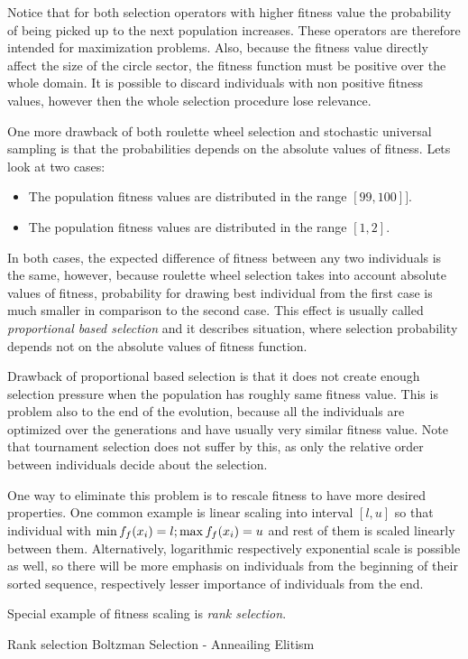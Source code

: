 Notice that for both selection operators with higher fitness value the probability of being picked up to the next population increases. These operators are therefore intended for maximization problems. Also, because the fitness value directly affect the size of the circle sector, the fitness function must be positive over the whole domain. It is possible to discard individuals with non positive fitness values, however then the whole selection procedure lose relevance.

One more drawback of both roulette wheel selection and stochastic universal sampling is that the probabilities depends on the absolute values of fitness. Lets look at two cases:
\begin{itemize}
    \item The population fitness values are distributed in the range $\left[ 99,100 \right]]$.
    \item The population fitness values are distributed in the range $\left[ 1, 2\right]$.
\end{itemize}
In both cases, the expected difference of fitness between any two individuals is the same, however, because roulette wheel selection takes into account absolute values of fitness, probability for drawing best individual from the first case is much smaller in comparison to the second case. This effect is usually called \emph{proportional based selection} and it describes situation, where selection probability depends not on the absolute values of fitness function.

Drawback of proportional based selection is that it does not create enough selection pressure when the population has roughly same fitness value. This is problem also to the end of the evolution, because all the individuals are optimized over the generations and have usually very similar fitness value. Note that tournament selection does not suffer by this, as only the relative order between individuals decide about the selection.

One way to eliminate this problem is to rescale fitness to have more desired properties. One common example is linear scaling into interval $\left[ l,u \right]$ so that individual with $\min f_f(x_i)=l; \max f_f(x_i)=u$ and rest of them is scaled linearly between them. Alternatively, logarithmic respectively exponential scale is possible as well, so there will be more emphasis on individuals from the beginning of their sorted sequence, respectively lesser importance of individuals from the end.

Special example of fitness scaling is \emph{rank selection}. 


Rank selection
Boltzman Selection - Anneailing
Elitism
